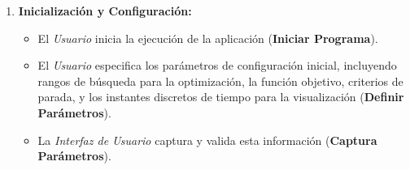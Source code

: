 \begin{enumerate}
    \item \textbf{Inicialización y Configuración:}
        \begin{itemize}
            \item El \textit{Usuario} inicia la ejecución de la aplicación (\textbf{Iniciar Programa}).
            \item El \textit{Usuario} especifica los parámetros de configuración inicial, incluyendo rangos de búsqueda para la optimización, la función objetivo, criterios de parada, y los instantes discretos de tiempo para la visualización (\textbf{Definir Parámetros}).
            \item La \textit{Interfaz de Usuario} captura y valida esta información (\textbf{Captura Parámetros}).
        \end{itemize}


\end{enumerate}

